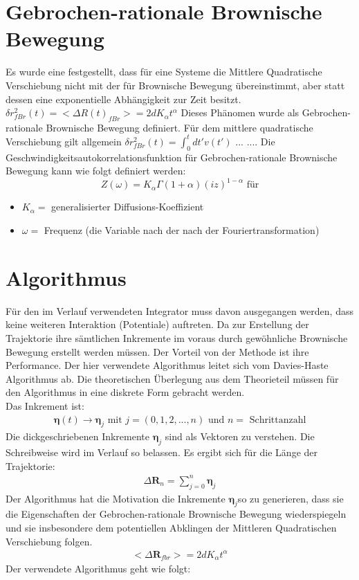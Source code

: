 \documentclass[
  a4paper,BCOR10mm,oneside,
  bibtotoc,idxtotoc,
  headsepline,footsepline,%
  fleqn,openbib
]{scrbook}
\begin{document}
\section{Gebrochen-rationale Brownische Bewegung}
Es wurde eine festgestellt, dass für eine Systeme die Mittlere Quadratische Verschiebung nicht mit der für Brownische Bewegung übereinstimmt, aber statt dessen eine exponentielle Abhängigkeit zur Zeit besitzt. $\delta r^{2}_{fBr}(t)= < \Delta R(t)_{fBr}>=2dK_{\alpha}t^{\alpha}$ Dieses Phänomen wurde als Gebrochen-rationale Brownische Bewegung definiert. Für dem mittlere quadratische Verschiebung gilt allgemein $\delta r^{2}_{fBr}(t) = \int^t_{0}dt' v(t')$ ...
....
Die Geschwindigkeitsautokorrelationsfunktion für Gebrochen-rationale Brownische Bewegung kann wie folgt definiert werden:
\begin{equation}
Z(\omega)= K_{\alpha} \Gamma(1+\alpha)(i z)^{1-\alpha} \text{   für} 
\end{equation}
\begin{itemize}
 \item $K_{\alpha} =$ generalisierter Diffusions-Koeffizient 
 \item $\omega = $ Frequenz (die Variable nach der  nach der Fouriertransformation)
\end{itemize}


\cite{Hofling2013}

\section{Algorithmus}
Für den im Verlauf verwendeten Integrator muss davon ausgegangen werden, dass keine weiteren Interaktion (Potentiale) auftreten. Da zur Erstellung der Trajektorie ihre sämtlichen Inkremente im voraus durch gewöhnliche Brownische Bewegung erstellt werden müssen. Der Vorteil von der Methode ist ihre Performance. Der hier verwendete Algorithmus leitet sich vom Davies-Haste Algorithmus \cite{Craigmile2003} ab. Die theoretischen Überlegung aus dem Theorieteil müssen für den Algorithmus in eine diskrete Form gebracht werden. \\Das Inkrement ist:
\begin{align}
\boldsymbol{\eta} (t) \longrightarrow \boldsymbol{\eta}_j  \text{  mit  } j=(0,1,2,...,n)  \text{  und  } n= \text{ Schrittanzahl}
\end{align}
Die dickgeschriebenen Inkremente $\boldsymbol{\eta}_j$ sind als Vektoren zu verstehen. Die Schreibweise wird im Verlauf so belassen.
Es ergibt sich für die Länge der Trajektorie:
\begin{align}
 \Delta \boldsymbol{R}_n =  \sum_{j=0}^n \boldsymbol{\eta}_j  \label{eq:diskretdeltar}
\end{align}
 Der Algorithmus hat die Motivation die Inkremente $ \boldsymbol{\eta}_j$so zu generieren, dass sie die Eigenschaften der Gebrochen-rationale Brownische Bewegung wiederspiegeln und sie insbesondere dem potentiellen Abklingen der Mittleren Quadratischen Verschiebung folgen.
\begin{align}
< \Delta \boldsymbol{R}_{fbr}>=2dK_{\alpha}t^{\alpha}
\end{align}
Der verwendete Algorithmus geht wie folgt:
 
\end{document}
